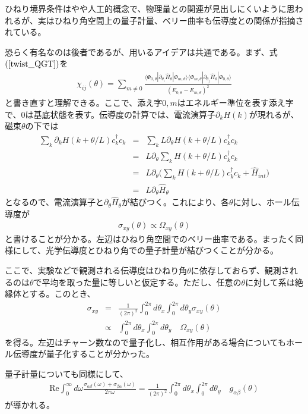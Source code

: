 \documentclass[12pt]{jsbook}
\newcommand{\la}{\langle}
\newcommand{\ra}{\rangle}
\newcommand{\pa}{\partial}
\begin{document}
ひねり境界条件はやや人工的概念で、物理量との関連が見出しにくいように思われるが、実はひねり角空間上の量子計量\cite{PhysRevB.62.1666}、ベリー曲率\cite{PhysRevB.31.3372}も伝導度との関係が指摘されている。

恐らく有名なのは後者であるが、用いるアイデアは共通である。まず、式$(\ref{twist_QGT})$を
\begin{eqnarray}
\chi_{ij}(\theta)=\displaystyle \sum_{m\neq 0}\frac{\la \Phi_{0,\theta}|\pa_{\theta_i} \hat{H}_\theta|\Phi_{m,\theta}\ra\la\Phi_{m,\theta}|\pa_{\theta_j} \hat{H}_\theta|\Phi_{0,\theta}\ra}{(E_{0,\theta}-E_{m,\theta})^2}
\end{eqnarray}
と書き直すと理解できる。ここで、添え字$0,m$はエネルギー準位を表す添え字で、$0$は基底状態を表す。伝導度の計算では、電流演算子$\pa _k H(k)$が現れるが、磁束$\theta$の下では
\begin{eqnarray}
\displaystyle \sum_k \pa _k H(k+\theta/L)c^{\dagger}_kc_k&=&\displaystyle \sum_k L \pa _\theta H(k+\theta/L)c^{\dagger}_kc_k\\
&=&L \pa _\theta\displaystyle \sum_k H(k+\theta/L)c^{\dagger}_kc_k\\
&=&L \pa _\theta\Big(\displaystyle \sum_k H(k+\theta/L)c^{\dagger}_kc_k + \hat{H}_{int}\Big)\\
&=&L \pa _\theta \hat{H}_\theta
\end{eqnarray}
となるので、電流演算子と$\pa _\theta \hat{H}_\theta$が結びつく。これにより、各$\theta$に対し、ホール伝導度が
\begin{eqnarray}
    \sigma_{xy}(\theta)\propto \Omega_{xy}(\theta)
\end{eqnarray}
と書けることが分かる。左辺はひねり角空間でのベリー曲率である。まったく同様にして、光学伝導度とひねり角での量子計量が結びつくことが分かる。

ここで、実験などで観測される伝導度はひねり角$\theta$に依存しておらず、観測されるのは$\theta$で平均を取った量に等しいと仮定する。ただし、任意の$\theta$に対して系は絶縁体とする。このとき、
\begin{eqnarray}
    \sigma_{xy} &=&\frac{1}{(2\pi)^2}\int_0^{2\pi}d\theta_x\int_0^{2\pi}d\theta_y \sigma_{xy}(\theta)\\
    &\propto& \int_0^{2\pi}d\theta_x\int_0^{2\pi}d\theta_y \quad\Omega_{xy}(\theta)
\end{eqnarray}
を得る。左辺はチャーン数なので量子化し、相互作用がある場合についてもホール伝導度が量子化することが分かった。

量子計量についても同様にして、
\begin{eqnarray}
\mathrm{Re} \int_0^{\infty}d\omega \frac{\sigma_{\alpha\beta}(\omega)+\sigma_{\beta\alpha}(\omega)}{2\pi\omega}=\frac{1}{(2\pi)^2}\int_0^{2\pi}d\theta_x\int_0^{2\pi}d\theta_y \quad g_{\alpha\beta}(\theta)
\end{eqnarray}
が導かれる。
\end{document}
